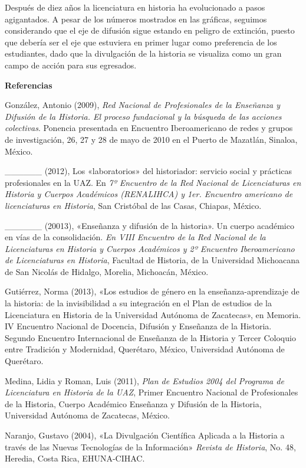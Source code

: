 Después de diez años la licenciatura en historia ha evolucionado a pasos
agigantados. A pesar de los números mostrados en las gráficas, seguimos
considerando que el eje de difusión sigue estando en peligro de extinción,
puesto que debería ser el eje que estuviera en primer lugar como preferencia de
los estudiantes, dado que la divulgación de la historia se visualiza como un
gran campo de acción para sus egresados. 
\newpage

\textbf{Referencias}

González, Antonio (2009), \textit{Red Nacional de Profesionales de la 
Enseñanza y Difusión de la Historia. El proceso fundacional y la 
búsqueda de las acciones colectivas}. Ponencia presentada en Encuentro 
Iberoamericano de redes y grupos de investigación, 26, 27 y 28 de mayo 
de 2010 en el Puerto de Mazatlán, Sinaloa, México.

\_\_\_\_\_\_ (2012), Los «laboratorios» del 
historiador: servicio social y prácticas profesionales en la UAZ\@. En 
\textit{7º Encuentro de la Red Nacional de Licenciaturas en Historia y 
Cuerpos Académicos (RENALIHCA) y 1er\@. Encuentro americano de 
licenciaturas en Historia}, San Cristóbal de las Casas, Chiapas, 
México.

\_\_\_\_\_\_ (20013), «Enseñanza y difusión de la historia». Un cuerpo académico en vías de la 
consolidación. \textit{En VIII Encuentro de la Red Nacional de la 
Licenciaturas en Historia y Cuerpos Académicos y 2º Encuentro 
Iberoamericano de Licenciaturas en Historia}, Facultad de Historia, de 
la Universidad Michoacana de San Nicolás de Hidalgo, Morelia, 
Michoacán, México.

Gutiérrez, Norma (2013), «Los estudios de género en la 
enseñanza-aprendizaje de la historia: de la invisibilidad a su 
integración en el Plan de estudios de la Licenciatura en Historia de la 
Universidad Autónoma de Zacatecas», en Memoria. 
IV Encuentro Nacional de Docencia, Difusión y Enseñanza de la Historia. 
Segundo Encuentro Internacional de Enseñanza de la Historia y Tercer 
Coloquio entre Tradición y Modernidad, Querétaro, 
México, Universidad Autónoma de Querétaro.
\newpage

Medina, Lidia y Roman, Luis (2011), \textit{Plan de Estudios 2004 del Programa de 
Licenciatura en Historia de la UAZ}, Primer Encuentro Nacional de 
Profesionales de la Historia, Cuerpo Académico Enseñanza y Difusión de 
la Historia, Universidad Autónoma de Zacatecas, México. 
 
Naranjo, Gustavo (2004), «La Divulgación Científica Aplicada a la 
Historia a través de las Nuevas Tecnologías de la Información» 
\textit{Revista de Historia}, No\@. 48, Heredia, Costa Rica, EHUNA-CIHAC\@. 

